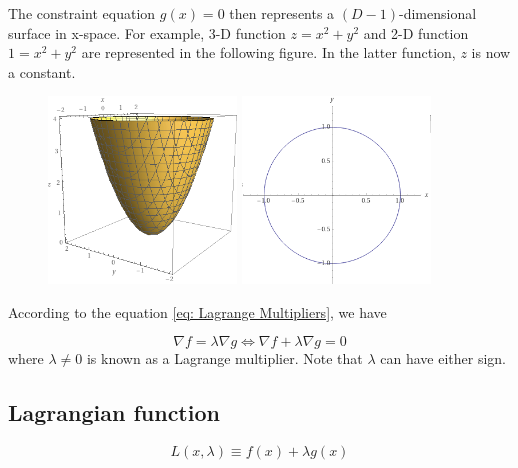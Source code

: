 \begin{flushleft}
The constraint equation $g(x)=0$ then represents a $(D-1)$-dimensional surface in x-space. For example, 3-D function $z=x^2+y^2$ and 2-D function $1=x^2+y^2$ are represented in the following figure. In the latter function, $z$ is now a constant.
\end{flushleft}

\begin{figure}
    \centering
    \subfloat
        \centering
        \includegraphics[width=5cm]{chapter003/figures/fig003}
    \qquad
    \subfloat
        \centering
            \includegraphics[width=5cm]{chapter003/figures/fig004}
    \label{fig:example}
\end{figure}

According to the equation \ref{eq: Lagrange Multipliers}, we have

\begin{equation}
    \nabla f = \lambda \nabla g \Leftrightarrow \nabla f + \lambda \nabla g = 0
\end{equation}
where $\lambda \neq 0$ is known as a Lagrange multiplier. Note that $\lambda$ can have either sign.

\subsection{Lagrangian function}
\begin{equation}
    \label{eq: Lagrangian function}
    L(x, \lambda) \equiv f(x) + \lambda g(x)
\end{equation}

